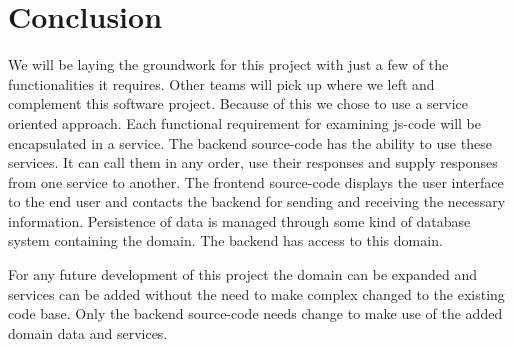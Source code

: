 \section{Conclusion}
We will be laying the groundwork for this project
with just a few of the functionalities it requires.
Other teams will pick up where we left and complement this software project.
Because of this we chose to use a service oriented approach.
Each functional requirement for examining \gls{js-code}
will be encapsulated in a service.
The backend \gls{source-code} has the ability to use these services.
It can call them in any order, use their responses
and supply responses from one service to another.
The frontend \gls{source-code} displays the user interface to the end user
and contacts the backend for sending and receiving the necessary information.
Persistence of data is managed through some kind of database system
containing the domain.
The backend has access to this domain.

For any future development of this project
the domain can be expanded
and services can be added
without the need to make complex changed to the existing code base.
Only the backend \gls{source-code} needs change
to make use of the added domain data and services.


